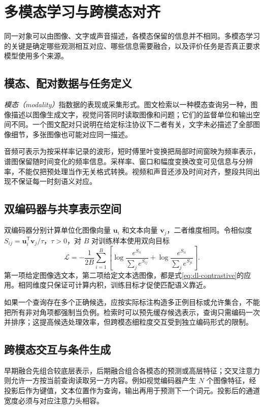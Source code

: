 \setcounter{chapter}{17} %
\chapter{多模态学习与跨模态对齐}
\label{chap:dl-multimodal}
同一对象可以由图像、文字或声音描述，各模态保留的信息并不相同。多模态学习的关键是确定哪些观测相互对应、哪些信息需要融合，以及评价任务是否真正要求模型使用多个来源。

\section{模态、配对数据与任务定义}
\emph{模态（modality）}指数据的表现或采集形式。图文检索以一种模态查询另一种，图像描述以图像生成文字，视觉问答同时读取图像和问题；它们的监督单位和输出空间不同。一个图文配对只说明在给定标注协议下二者有关，文字未必描述了全部图像细节，多张图像也可能对应同一描述。

音频可表示为按采样率记录的波形，短时傅里叶变换把局部时间窗映为频率表示，谱图保留随时间变化的频率信息。采样率、窗口和幅度变换改变可见信息与分辨率，不能仅把预处理当作无关格式转换。视频和声音还涉及时间对齐，整段共同出现不保证每一时刻语义对应。

\section{双编码器与共享表示空间}
双编码器分别计算单位化图像向量 $\mathbf u_i$ 和文本向量 $\mathbf v_j$，二者维度相同。令相似度 $S_{ij}=\mathbf u_i^\mathsf T\mathbf v_j/\tau$，$\tau>0$，对 $B$ 对训练样本使用双向目标
\begin{equation}
\mathcal L=-\frac1{2B}\sum_{i=1}^B\left[\log\frac{e^{S_{ii}}}{\sum_je^{S_{ij}}}+\log\frac{e^{S_{ii}}}{\sum_je^{S_{ji}}}\right].
\label{eq:dl-multimodal-contrast}
\end{equation}
第一项给定图像选文本，第二项给定文本选图像，都是式\eqref{eq:dl-contrastive}的应用。相同维度只保证可计算内积，训练目标才促使匹配语义靠近。

如果一个查询存在多个正确候选，应按实际标注构造多正例目标或允许集合，不能把所有非对角项都强制当负例。检索时可以预先缓存候选表示，查询只需编码一次并排序；这提高候选处理效率，但跨模态细粒度交互受到独立编码形式的限制。

\section{跨模态交互与条件生成}
早期融合先组合较底层表示，后期融合组合各模态的预测或高层特征；交叉注意力则允许一方按当前查询读取另一方内容。例如视觉编码器产生 $N$ 个图像特征，经投影后作为键值，文本位置作为查询，输出再用于预测下一个词元。投影后的通道宽度必须与对应注意力头相容。

